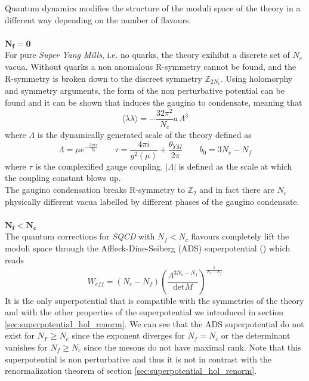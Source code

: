 Quantum dynamics modifies the structure of the moduli space of the theory in a different way depending on the number of flavours.
\\
\\
{$\mathbf{N_f= 0}$}\\
 For pure \emph{Super Yang Mills}, i.e. no quarks, the theory exihibit a discrete set of $N_c$ vacua. 
Without quarks a non anomalous R-symmetry cannot be found,
and the R-symmetry is broken down to the discreet symmetry $\mathbb{Z}_{2 N_c}$.
Using holomorphy and symmetry arguments, the form of the non perturbative potential can be found and it can be shown that induces the gaugino to condensate, meaning that 
\begin{equation}
\langle \lambda \lambda \rangle = - \frac{32 \pi^2}{N_c} a \, \Lambda^3
\end{equation}
where $\Lambda$ is the dynamically generated scale of the theory defined as
\begin{equation}
\Lambda = \mu e^{-\frac{2 \pi i \tau}{b_0}} \qquad 
\tau  = \frac{4 \pi i}{g^2 (\mu) } + \frac{\theta_{YM}}{2 \pi}  \qquad b_0 = 3 N_c - N_f
\end{equation}
where $\tau$ is the complexified gauge coupling.
$|\Lambda|$ is defined as the scale at which the coupling constant blows up.\\
The gaugino condensation breaks R-symmetry to $\mathbb{Z}_2$ and in fact there are $N_c$ physically different vacua labelled by different phases of the gaugino condensate.
\\
\\
$\mathbf{ N_f < N_c}$\\
The quantum corrections for \emph{SQCD} with $N_f < N_c$ flavours completely lift the moduli space through the Affleck-Dine-Seiberg (ADS) superpotential (\cite{Davis:1983mz}\cite{Affleck:1983mk}) which reads
\begin{equation}
W_{eff} = \left( N_c - N_f  \right)\left( 
\frac{\Lambda^{3N_c -  N_f }}
{\mathrm{det} {M}}
\right)^{ \frac{1}{N_c - N_f}}
\end{equation}
It is the only superpotential that is compatible with the symmetries of the theory and with the other properties of the superpotential we introduced in section \ref{sec:superpotential_hol_renorm}.
We can see that the ADS superpotential do not exist for $N_F \geq N_c$ since the exponent diverges for $N_f = N_c$ or the determinant vanishes for $N_f \ge N_c$ since the mesons do not have maximal rank.
Note that this superpotential is non perturbative and thus it is not in contrast with the renormalization theorem of section \ref{sec:superpotential_hol_renorm}.
